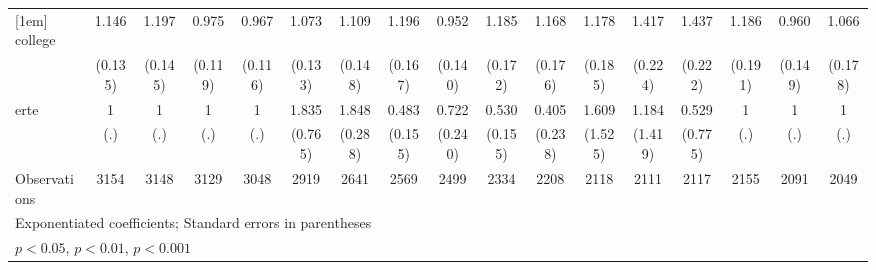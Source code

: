 {\begin{tabular}{l*{16}{c}}
[1em]
college             &       1.146         &       1.197         &       0.975         &       0.967         &       1.073         &       1.109         &       1.196         &       0.952         &       1.185         &       1.168         &       1.178         &       1.417\sym{*}  &       1.437\sym{*}  &       1.186         &       0.960         &       1.066         \\
                    &     (0.135)         &     (0.145)         &     (0.119)         &     (0.116)         &     (0.133)         &     (0.148)         &     (0.167)         &     (0.140)         &     (0.172)         &     (0.176)         &     (0.185)         &     (0.224)         &     (0.222)         &     (0.191)         &     (0.149)         &     (0.178)         \\
[1em]
erte                &           1         &           1         &           1         &           1         &       1.835         &       1.848\sym{***}&       0.483\sym{*}  &       0.722         &       0.530\sym{*}  &       0.405         &       1.609         &       1.184         &       0.529         &           1         &           1         &           1         \\
                    &         (.)         &         (.)         &         (.)         &         (.)         &     (0.765)         &     (0.288)         &     (0.155)         &     (0.240)         &     (0.155)         &     (0.238)         &     (1.525)         &     (1.419)         &     (0.775)         &         (.)         &         (.)         &         (.)         \\
\hline
Observations        &        3154         &        3148         &        3129         &        3048         &        2919         &        2641         &        2569         &        2499         &        2334         &        2208         &        2118         &        2111         &        2117         &        2155         &        2091         &        2049         \\
\hline\hline
\multicolumn{17}{l}{\footnotesize Exponentiated coefficients; Standard errors in parentheses}\\
\multicolumn{17}{l}{\footnotesize \sym{*} \(p<0.05\), \sym{**} \(p<0.01\), \sym{***} \(p<0.001\)}\\
\end{tabular}
}
